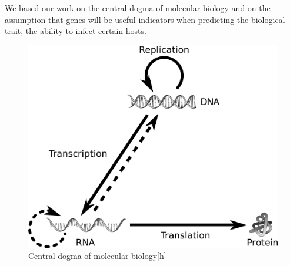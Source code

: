We based our work on the central dogma of molecular biology and on the assumption that genes will be useful indicators when predicting the biological trait, the ability to infect certain hosts.

\begin{figure}[htp]
\includegraphics[width=\linewidth]{./images/central_dogma.png}
\centering
\caption{Central dogma of molecular biology[h]}
\end{figure}

